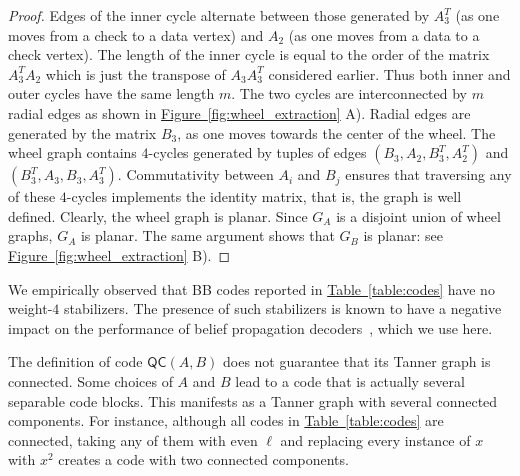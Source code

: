 \documentclass{article}
\newcommand{\qc}{\mathsf{QC}(A,B)}
\newcommand{\fig}[1]{\hyperref[fig:#1]{Figure~\ref*{fig:#1}}}
\newcommand{\tab}[1]{\hyperref[table:#1]{Table~\ref*{table:#1}}}
\begin{document}
\begin{proof}
Edges of the inner cycle  alternate between those generated by $A_3^T$
(as one moves from a check to a data vertex) and $A_2$ (as one moves from a data to a check vertex). 
The length of the inner cycle is equal to the order of the matrix $A_3^T A_2$ which is just the transpose of $A_3A_3^T$ considered earlier. Thus both inner and outer cycles have the same length $m$. The two cycles are interconnected by $m$ radial edges as shown in \fig{wheel_extraction} A). 
Radial edges are generated by the matrix $B_3$,
as one moves  towards the center of the wheel. 
The wheel graph contains $4$-cycles
generated by tuples of edges $(B_3,A_2,B_3^T,A_2^T)$ and
$(B_3^T,A_3,B_3,A_3^T)$.
Commutativity between $A_i$ and $B_j$
ensures that traversing any of these $4$-cycles implements the identity matrix, that is,
the graph is well defined. 
Clearly, the wheel graph is planar. Since $G_A$ is a disjoint union of wheel graphs, $G_A$ is planar. 
The same argument shows that $G_B$ is planar: see \fig{wheel_extraction} B).
\end{proof}

We empirically observed that  BB codes reported in \tab{codes} have no weight-$4$ stabilizers.
The presence of
such stabilizers
is known to have a negative impact on the performance
of belief propagation decoders~\cite{panteleev2021degenerate}, which we use here.

The definition of code $\qc$ does not guarantee that its Tanner graph is connected. Some choices of $A$ and $B$ lead to a code that is actually several separable code blocks. This manifests as a Tanner graph with several connected components. For instance, although all codes in \tab{codes} are connected, taking any of them with even $\ell$ and replacing every instance of $x$ with $x^2$ creates a code with two connected components.
\end{document}
